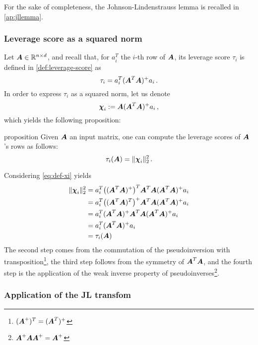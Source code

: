 For the sake of completeness, the Johnson-Lindenstrauss lemma is recalled in
\autoref{ap:jllemma}.

\subsubsection{Leverage score as a squared norm}

Let $\boldsymbol A \in \mathbb R^{n \times d}$, and recall that, for $a_i^T$ the $i$-th row
of $\boldsymbol A$, its leverage score $\tau_i$ is defined in \autoref{def:leverage-score}
as
$$
    \tau_i = a_i^T(\boldsymbol A^T\boldsymbol A)^+a_i \, .
$$
In order to express $\tau_i$ as a squared norm, let us denote
\begin{equation}\label{eq:def-xi}
    \boldsymbol {\chi}_i := \boldsymbol A(\boldsymbol A^T\boldsymbol A)^+ a_i \, ,
\end{equation}
which yields the following proposition:
\begin{theoremEnd}{proposition}\label{prop:lv-as-norm}
    Given $\boldsymbol A$ an input matrix, one can compute the leverage scores of $\boldsymbol A$'s rows
    as follows:
    $$
        \tau_i(\boldsymbol A) = \|\boldsymbol {\chi}_i \|_2^2 \, .
    $$
\end{theoremEnd}

\begin{proofEnd}
   Considering \autoref{eq:def-xi} yields
   \begin{equation*}
    \begin{aligned}
        \|\boldsymbol {\chi}_i \|_2^2
            & = a_i^T \big((\boldsymbol A^T\boldsymbol A)^+\big)^T \boldsymbol A^T\boldsymbol A (\boldsymbol A^T\boldsymbol A)^+ a_i \\
            & = a_i^T \big((\boldsymbol A^T\boldsymbol A)^T\big)^+ \boldsymbol A^T\boldsymbol A (\boldsymbol A^T\boldsymbol A)^+ a_i \\
            & = a_i^T (\boldsymbol A^T\boldsymbol A)^+ \boldsymbol A^T\boldsymbol A (\boldsymbol A^T\boldsymbol A)^+ a_i \\
            & = a_i^T (\boldsymbol A^T\boldsymbol A)^+ a_i \\
            & = \tau_i(\boldsymbol A)
    \end{aligned}
   \end{equation*}
The second step comes from the commutation of the pseudoinversion with
transposition\footnote{$(\boldsymbol A^+)^T = (\boldsymbol A^T)^+$}, the third step follows
from the symmetry of $\boldsymbol A^T\boldsymbol A$, and the fourth step is the application of the
weak inverse property of pseudoinverses\footnote{$\boldsymbol A^+\boldsymbol A\boldsymbol A^+ = \boldsymbol A^+$}.
\end{proofEnd}


\subsubsection{Application of the JL transfom}

